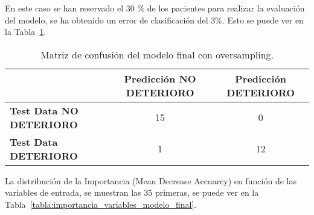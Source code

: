 En este caso se han reservado el 30 \% de los pacientes para realizar la evaluación del modelo, se ha obtenido un error de clasificación del 3\%. Esto se puede ver en la Tabla~\ref{tabla:confusion_matrix_final}.
\begin{table}[H]
    \centering
    \begin{tabular}{lcc}
        \toprule
        & \textbf{Predicción NO DETERIORO} & \textbf{Predicción DETERIORO} \\
        \midrule
        \textbf{Test Data NO DETERIORO} & 15 & 0 \\
        \textbf{Test Data DETERIORO} & 1 & 12 \\
        \bottomrule
    \end{tabular}
    \caption{Matriz de confusión del modelo final con oversampling.}
    \label{tabla:confusion_matrix_final}
\end{table}
    

La distribución de la Importancia (Mean Decrease Accuarcy) en función de las variables de entrada, se muestran las 35 primeras, se puede ver en la Tabla~\ref{tabla:importancia_variables_modelo_final}.

